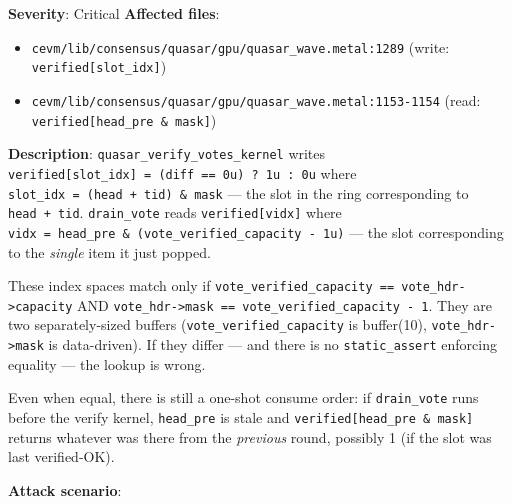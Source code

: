 \documentclass[
]{article}
\providecommand{\tightlist}{%
  \setlength{\itemsep}{0pt}\setlength{\parskip}{0pt}}
\begin{document}
\textbf{Severity}: Critical \textbf{Affected files}:

\begin{itemize}
\tightlist
\item
  \texttt{cevm/lib/consensus/quasar/gpu/quasar\_wave.metal:1289} (write:
  \texttt{verified{[}slot\_idx{]}})
\item
  \texttt{cevm/lib/consensus/quasar/gpu/quasar\_wave.metal:1153-1154}
  (read: \texttt{verified{[}head\_pre\ \&\ mask{]}})
\end{itemize}

\textbf{Description}: \texttt{quasar\_verify\_votes\_kernel} writes
\texttt{verified{[}slot\_idx{]}\ =\ (diff\ ==\ 0u)\ ?\ 1u\ :\ 0u} where
\texttt{slot\_idx\ =\ (head\ +\ tid)\ \&\ mask} --- the slot in the ring
corresponding to \texttt{head\ +\ tid}. \texttt{drain\_vote} reads
\texttt{verified{[}vidx{]}} where
\texttt{vidx\ =\ head\_pre\ \&\ (vote\_verified\_capacity\ -\ 1u)} ---
the slot corresponding to the \emph{single} item it just popped.

These index spaces match only if
\texttt{vote\_verified\_capacity\ ==\ vote\_hdr-\textgreater{}capacity}
AND
\texttt{vote\_hdr-\textgreater{}mask\ ==\ vote\_verified\_capacity\ -\ 1}.
They are two separately-sized buffers (\texttt{vote\_verified\_capacity}
is buffer(10), \texttt{vote\_hdr-\textgreater{}mask} is data-driven). If
they differ --- and there is no \texttt{static\_assert} enforcing
equality --- the lookup is wrong.

Even when equal, there is still a one-shot consume order: if
\texttt{drain\_vote} runs before the verify kernel, \texttt{head\_pre}
is stale and \texttt{verified{[}head\_pre\ \&\ mask{]}} returns whatever
was there from the \emph{previous} round, possibly 1 (if the slot was
last verified-OK).

\textbf{Attack scenario}:
\end{document}
